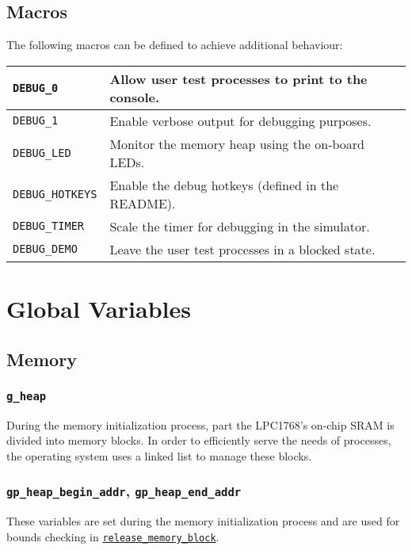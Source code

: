 \documentclass[12pt]{report}
\begin{document}
\section{Macros}

The following macros can be defined to achieve additional behaviour:\\

\begin{tabularx}{\textwidth}{| l | X |}
    \hline
    \texttt{DEBUG_0} & Allow user test processes to print to the console.\\
    \hline
    \texttt{DEBUG_1} & Enable verbose output for debugging purposes.\\
    \hline
    \texttt{DEBUG_LED} & Monitor the memory heap using the on-board LEDs.\\
    \hline
    \texttt{DEBUG_HOTKEYS} & Enable the debug hotkeys (defined in the README).\\
    \hline
    \texttt{DEBUG_TIMER} & Scale the timer for debugging in the simulator.\\
    \hline
    \texttt{DEBUG_DEMO} & Leave the user test processes in a blocked state.\\
    \hline
\end{tabularx}

\chapter{Global Variables}

\section{Memory}

\subsection{\texttt{g_heap}}

During the memory initialization process, part the LPC1768's on-chip SRAM is divided into memory blocks. In order to efficiently serve the needs of processes, the operating system uses a linked list to manage these blocks.

\subsection{\texttt{gp_heap_begin_addr}, \texttt{gp_heap_end_addr}}

These variables are set during the memory initialization process and are used for bounds checking in \hyperref[alg:releasingmemoryblocks]{\texttt{release_memory_block}}.
\end{document}
